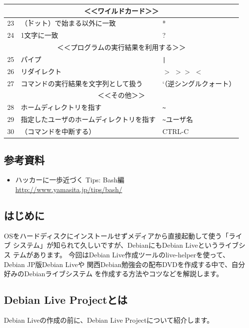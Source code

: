 \documentclass[mingoth,a4paper]{jsarticle}
\begin{document}
\begin{table}[h]
\begin{center}
\begin{tabular}{|r|l|l|}
\multicolumn{3}{|c|}{＜＜ワイルドカード＞＞}\\ \hline
23 & \.（ドット）で始まる以外に一致 & * \\ \hline
24 & 1文字に一致 & ? \\ \hline
\multicolumn{3}{|c|}{＜＜プログラムの実行結果を利用する＞＞}\\ \hline
25 & パイプ & \verb+|+ \\ \hline
26 & リダイレクト & $>$ $>>$ $<$ \\ \hline
27 & コマンドの実行結果を文字列として扱う & `（逆シングルクォート） \\ \hline
\multicolumn{3}{|c|}{＜＜その他＞＞}\\ \hline
28 & ホームディレクトリを指す & \verb+~+ \\ \hline
29 & 指定したユーザのホームディレクトリを指す & \verb+~+ユーザ名 \\ \hline
30 & （コマンドを中断する） & CTRL-C \\ \hline
\end{tabular}
\label{sonota} 
\end{center}
\end{table}

\subsection{参考資料}

\begin{itemize}
 \item ハッカーに一歩近づく Tips: Bash編\\
       \url{http://www.yamasita.jp/tips/bash/}
\end{itemize}

\subsection{はじめに}
OSをハードディスクにインストールせずメディアから直接起動して使う「ライブ
システム」が知られて久しいですが、DebianにもDebian Liveというライブシス
テムがあります。
今回はDebian Live作成ツールのlive-helperを使って、Debian JP版Debian Liveや
関西Debian勉強会の配布DVDを作成する中で、自分好みのDebianライブシステム
を作成する方法やコツなどを解説します。

\subsection{Debian Live Projectとは}
Debian Liveの作成の前に、Debian Live Projectについて紹介します。
\end{document}
